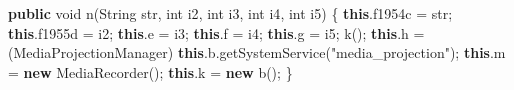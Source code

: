 \documentclass[
]{article}
\newenvironment{Shaded}{}{}
\newcommand{\BuiltInTok}[1]{\textcolor[rgb]{0.00,0.50,0.00}{#1}}
\newcommand{\DataTypeTok}[1]{\textcolor[rgb]{0.56,0.13,0.00}{#1}}
\newcommand{\FunctionTok}[1]{\textcolor[rgb]{0.02,0.16,0.49}{#1}}
\newcommand{\KeywordTok}[1]{\textcolor[rgb]{0.00,0.44,0.13}{\textbf{#1}}}
\newcommand{\NormalTok}[1]{#1}
\newcommand{\OperatorTok}[1]{\textcolor[rgb]{0.40,0.40,0.40}{#1}}
\newcommand{\StringTok}[1]{\textcolor[rgb]{0.25,0.44,0.63}{#1}}
\begin{document}
\begin{Shaded}
\begin{Highlighting}[]
    \KeywordTok{public} \DataTypeTok{void} \FunctionTok{n}\OperatorTok{(}\BuiltInTok{String}\NormalTok{ str}\OperatorTok{,} \DataTypeTok{int}\NormalTok{ i2}\OperatorTok{,} \DataTypeTok{int}\NormalTok{ i3}\OperatorTok{,} \DataTypeTok{int}\NormalTok{ i4}\OperatorTok{,} \DataTypeTok{int}\NormalTok{ i5}\OperatorTok{)} \OperatorTok{\{}
        \KeywordTok{this}\OperatorTok{.}\FunctionTok{f1954c} \OperatorTok{=}\NormalTok{ str}\OperatorTok{;}
        \KeywordTok{this}\OperatorTok{.}\FunctionTok{f1955d} \OperatorTok{=}\NormalTok{ i2}\OperatorTok{;}
        \KeywordTok{this}\OperatorTok{.}\FunctionTok{e} \OperatorTok{=}\NormalTok{ i3}\OperatorTok{;}
        \KeywordTok{this}\OperatorTok{.}\FunctionTok{f} \OperatorTok{=}\NormalTok{ i4}\OperatorTok{;}
        \KeywordTok{this}\OperatorTok{.}\FunctionTok{g} \OperatorTok{=}\NormalTok{ i5}\OperatorTok{;}
        \FunctionTok{k}\OperatorTok{();}
        \KeywordTok{this}\OperatorTok{.}\FunctionTok{h} \OperatorTok{=} \OperatorTok{(}\NormalTok{MediaProjectionManager}\OperatorTok{)} \KeywordTok{this}\OperatorTok{.}\FunctionTok{b}\OperatorTok{.}\FunctionTok{getSystemService}\OperatorTok{(}\StringTok{"media\_projection"}\OperatorTok{);}
        \KeywordTok{this}\OperatorTok{.}\FunctionTok{m} \OperatorTok{=} \KeywordTok{new} \FunctionTok{MediaRecorder}\OperatorTok{();}
        \KeywordTok{this}\OperatorTok{.}\FunctionTok{k} \OperatorTok{=} \KeywordTok{new} \FunctionTok{b}\OperatorTok{();}
    \OperatorTok{\}}


\end{Highlighting}
\end{Shaded}
\end{document}
